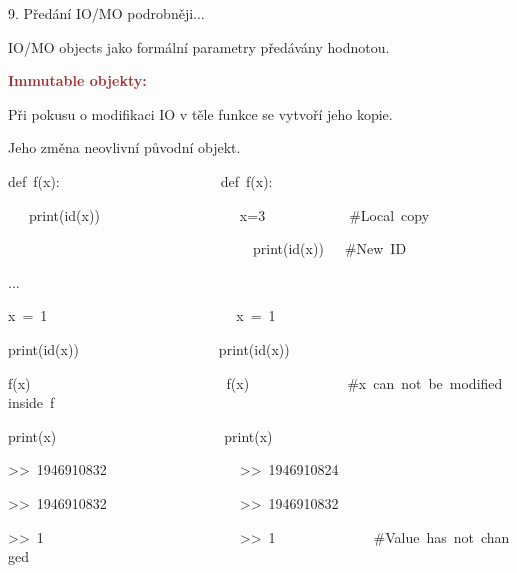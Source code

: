 \documentclass[czech]{beamer}
\newenvironment{lyxcode}
  {\par\begin{list}{}{
    \setlength{\rightmargin}{\leftmargin}
    \setlength{\listparindent}{0pt}%
    \raggedright
    \setlength{\itemsep}{0pt}
    \setlength{\parsep}{0pt}
    \normalfont\ttfamily}%
   \def\{{\char`\{}
   \def\}{\char`\}}
   \def\textasciitilde{\char`\~}
   \item[]}
  {\end{list}}
\begin{document}
\begin{frame}{9. Předání IO/MO podrobněji...}

{\tiny IO/MO objects jako formální parametry předávány hodnotou.}{\tiny\par}

{\tiny\medskip{}
}{\tiny\par}

{\tiny\textbf{\textcolor{brown}{Immutable objekty:}}}{\tiny\par}

{\tiny Při pokusu o modifikaci IO v těle funkce se vytvoří jeho kopie.}{\tiny\par}

{\tiny Jeho změna neovlivní původní objekt.}{\tiny\par}
\begin{lyxcode}
{\tiny def~f(x):~~~~~~~~~~~~~~~~~~~~~~~def~f(x):~~}{\tiny\par}

{\tiny ~~~print(id(x))~~~~~~~~~~~~~~~~~~~~x=3~~~~~~~~~~~~\#Local~copy}{\tiny\par}

{\tiny ~~~~~~~~~~~~~~~~~~~~~~~~~~~~~~~~~~~print(id(x))~~~\#New~ID}{\tiny\par}

{\tiny ...~~~~~~~~~~~~~~~~~~~~~~~~~~~~~~}{\tiny\par}

{\tiny x~=~1~~~~~~~~~~~~~~~~~~~~~~~~~~~x~=~1~~~~~~~~~~~~}{\tiny\par}

{\tiny print(id(x))~~~~~~~~~~~~~~~~~~~~print(id(x))~}{\tiny\par}

{\tiny f(x)~~~~~~~~~~~~~~~~~~~~~~~~~~~~f(x)~~~~~~~~~~~~~~\#x~can~not~be~modified~inside~f}{\tiny\par}

{\tiny print(x)~~~~~~~~~~~~~~~~~~~~~~~~print(x)}{\tiny\par}

{\tiny >\textcompwordmark >~1946910832~~~~~~~~~~~~~~~~~~~>\textcompwordmark >~1946910824}{\tiny\par}

{\tiny >\textcompwordmark >~1946910832~~~~~~~~~~~~~~~~~~~>\textcompwordmark >~1946910832}{\tiny\par}

{\tiny >\textcompwordmark >~1~~~~~~~~~~~~~~~~~~~~~~~~~~~~>\textcompwordmark >~1~~~~~~~~~~~~~~\#Value~has~not~changed}{\tiny\par}
\end{lyxcode}
{\tiny\medskip{}
}{\tiny\par}


\end{frame}
\end{document}

